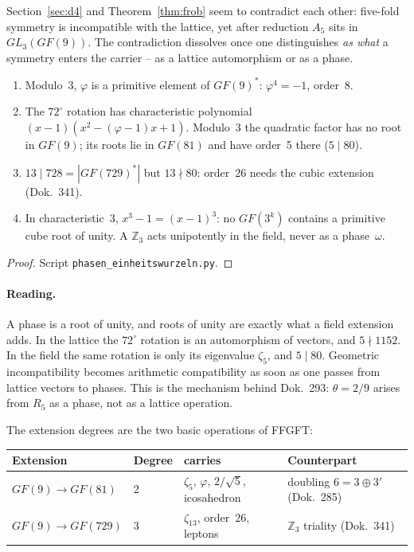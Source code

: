 Section~\ref{sec:d4} and Theorem~\ref{thm:frob} seem to contradict each other:
five-fold symmetry is incompatible with the lattice, yet after reduction
$A_5$ sits in $GL_3(GF(9))$. The contradiction dissolves once one
distinguishes \emph{as what} a symmetry enters the carrier -- as a lattice
automorphism or as a phase.

\begin{theorem}\label{thm:phasen}
\begin{enumerate}[nosep]
\item Modulo~3, $\varphi$ is a primitive element of $GF(9)^*$:
      $\varphi^4=-1$, order~8.
\item The $72^\circ$ rotation has characteristic polynomial
      $(x-1)(x^2-(\varphi-1)x+1)$. Modulo~3 the quadratic factor has no root
      in $GF(9)$; its roots lie in $GF(81)$ and have order~5 there ($5\mid80$).
\item $13\mid728=|GF(729)^*|$ but $13\nmid80$: order~26 needs the cubic
      extension (Dok.~341).
\item In characteristic~3, $x^3-1=(x-1)^3$: no $GF(3^k)$ contains a
      primitive cube root of unity. A $\mathbb{Z}_3$ acts unipotently in the
      field, never as a phase~$\omega$.
\end{enumerate}
\end{theorem}

\begin{proof}
Script \texttt{phasen\_einheitswurzeln.py}.
\end{proof}

\paragraph{Reading.} A phase is a root of unity, and roots of unity are
exactly what a field extension adds. In the lattice the $72^\circ$
rotation is an automorphism of vectors, and $5\nmid1152$. In the field the
same rotation is only its eigenvalue $\zeta_5$, and $5\mid80$. Geometric
incompatibility becomes arithmetic compatibility as soon as one passes
from lattice vectors to phases. This is the mechanism behind Dok.~293:
$\theta=2/9$ arises from $R_5$ as a phase, not as a lattice operation.

The extension degrees are the two basic operations of FFGFT:
\begin{center}
\begin{tabular}{@{}llll@{}}
\toprule
Extension & Degree & carries & Counterpart \\
\midrule
$GF(9)\to GF(81)$ & 2 & $\zeta_5$, $\varphi$, $2/\sqrt5$, icosahedron & doubling $6=3\oplus3'$ (Dok.~285) \\
$GF(9)\to GF(729)$ & 3 & $\zeta_{13}$, order~26, leptons & $\mathbb{Z}_3$ triality (Dok.~341) \\
\bottomrule
\end{tabular}
\end{center}

